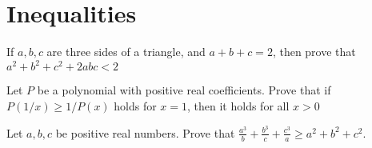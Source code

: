 




\sloppy
\maketitle

\begin{center}
    \begin{minipage}{0.8\textwidth} 
        \small 
        \setlength{\parindent}{0.3in}
        \lipsum[2] %
    \end{minipage}
\end{center}

\vspace{2em} 


\setlength{\parindent}{0.3in} \lipsum[3] \\ %
\setlength{\parindent}{0.3in} \lipsum[2] \\

\newpage
\thispagestyle{firstpageheader}

\section{Inequalities}


\begin{problem}[Q][2][Pathfinder]
    If $a,b,c$ are three sides of a triangle, and $a+b+c=2$, then prove that $a^2+b^2+c^2+2abc<2$
\end{problem}
\vskip 3mm

\begin{problem}[Q][4][Andreescu]
    Let $P$ be a polynomial with positive real coefficients. Prove that if $P(1/x) \geq 1/P(x)$ holds for $x=1$, then it holds for all $x>0$
\end{problem}

\begin{problem}[Q][4]
    Let $a,b,c$ be positive real numbers. Prove that $\frac{a^3}{b}+\frac{b^3}{c}+\frac{c^3}{a} \geq a^2+b^2+c^2$.
\end{problem}

